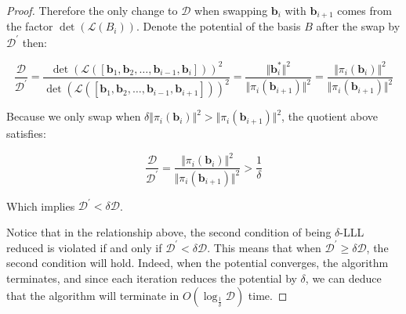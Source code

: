 \begin{proof}
    Therefore the only change to $\mathcal{D}$ when swapping $\mathbf{b}_i$ with $\mathbf{b}_{i+1}$ comes from the factor $\det(\mathcal{L}(B_i))$. Denote the potential of the basis $B$ after the swap by $\mathcal{D}^\prime$ then:
    
    $$
    \frac{\mathcal{D}}{\mathcal{D}^\prime} = \frac{
        \det(\mathcal{L}([\mathbf{b}_1, \mathbf{b}_2, \ldots, \mathbf{b}_{i-1}, \mathbf{b}_{i}]))^2
    }{
        \det(\mathcal{L}([\mathbf{b}_1, \mathbf{b}_2, \ldots, \mathbf{b}_{i-1}, \mathbf{b}_{i+1}]))^2
    } = \frac{\Vert\mathbf{b}_i^\ast\Vert^2}{\Vert\pi_i(\mathbf{b}_{i+1})\Vert^2}
    = \frac{\Vert\pi_i(\mathbf{b}_{i})\Vert^2}{\Vert\pi_i(\mathbf{b}_{i+1})\Vert^2}
    $$

    Because we only swap when $\delta \Vert \pi_i(\mathbf{b}_i) \Vert^2 > \Vert \pi_i(\mathbf{b}_{i+1}) \Vert^2$, the quotient above satisfies:

    $$
    \frac{\mathcal{D}}{\mathcal{D}^\prime} 
    = \frac{\Vert\pi_i(\mathbf{b}_{i})\Vert^2}{\Vert\pi_i(\mathbf{b}_{i+1})\Vert^2}
    > \frac{1}{\delta}
    $$

    Which implies $\mathcal{D}^\prime < \delta \mathcal{D}$.

    Notice that in the relationship above, the second condition of being $\delta$-LLL reduced is violated if and only if $\mathcal{D}^\prime < \delta\mathcal{D}$. This means that when $\mathcal{D}^\prime \geq \delta\mathcal{D}$, the second condition will hold. Indeed, when the potential converges, the algorithm terminates, and since each iteration reduces the potential by $\delta$, we can deduce that the algorithm will terminate in $O(\log_{\frac{1}{\delta}}\mathcal{D})$ time.
\end{proof}
